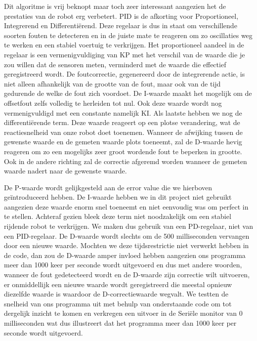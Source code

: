 Dit algoritme is vrij beknopt maar toch zeer interessant aangezien het de prestaties van de robot erg verbetert. PID is de afkorting voor Proportioneel, Integrerend en Differenti\"erend. Deze regelaar is dus in staat om verschillende soorten fouten te detecteren en in de juiste mate te reageren om zo oscillaties weg te werken en een stabiel voertuig te verkrijgen. Het proportioneel aandeel in de regelaar is een vermenigvuldiging van KP met het verschil van de waarde die je zou willen dat de sensoren meten, verminderd met de waarde die effectief geregistreerd wordt. De foutcorrectie, gegenereerd door de integrerende actie, is niet alleen afhankelijk van de grootte van de fout, maar ook van de tijd gedurende de welke de fout zich voordoet. De I-waarde maakt het mogelijk om de offsetfout zelfs volledig te herleiden tot nul. Ook deze waarde wordt nog vermenigvuldigd met een constante namelijk KI. Als laatste hebben we nog de differenti\"erende term. Deze waarde reageert op een plotse verandering, wat de reactiesnelheid van onze robot doet toenemen. Wanneer de afwijking tussen de gewenste waarde en de gemeten waarde plots toeneemt, zal de D-waarde hevig reageren om zo een mogelijks zeer groot wordende fout te beperken in grootte. Ook in de andere richting zal de correctie afgeremd worden wanneer de gemeten waarde nadert naar de gewenste waarde. 

De P-waarde wordt gelijkgesteld aan de error value die we hierboven ge\"introduceerd hebben. De I-waarde hebben we in dit project niet gebruikt aangezien deze waarde enorm snel toeneemt en niet eenvoudig was om perfect in te stellen. Achteraf gezien bleek deze term niet noodzakelijk om een stabiel rijdende robot te verkrijgen. We maken dus gebruik van een PD-regelaar, niet van een PID-regelaar. De D-waarde wordt slechts om de 500 milliseconden vervangen door een nieuwe waarde. Mochten we deze tijdsrestrictie niet verwerkt hebben in de code, dan zou de D-waarde amper invloed hebben aangezien ons programma meer dan 1000 keer per seconde wordt uitgevoerd en dus met andere woorden, wanneer de fout gedetecteerd wordt en de D-waarde zijn correctie wilt uitvoeren, er onmiddellijk een nieuwe waarde wordt geregistreerd die meestal opnieuw diezelfde waarde is waardoor de D-correctiewaarde wegvalt. We testten de snelheid van ons programma uit met behulp van onderstaande code om tot dergelijk inzicht te komen en verkregen een uitvoer in de Seri\"ele monitor van 0 milliseconden wat dus illustreert dat het programma meer dan 1000 keer per seconde wordt uitgevoerd. 

